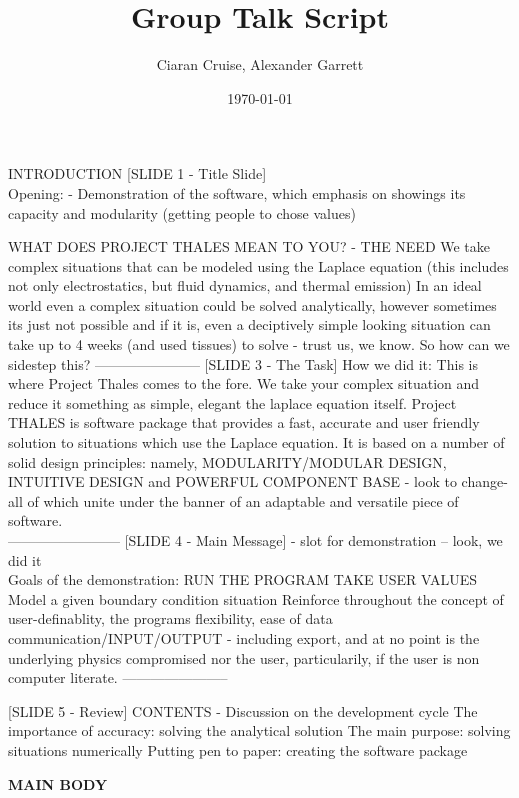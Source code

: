 \documentclass{article}
\title{Group Talk Script}
\author{Ciaran Cruise, Alexander Garrett}
\date{\today}
\begin{document}
\maketitle



INTRODUCTION
[SLIDE 1 - Title Slide]\\
Opening: 
- Demonstration of the software, which emphasis on showings its capacity and modularity (getting people to chose values)

WHAT DOES PROJECT THALES MEAN TO YOU? - THE NEED
We take complex situations that can be modeled using the Laplace equation (this includes not only electrostatics, but fluid dynamics, and thermal emission)
In an ideal world even a complex situation could be solved analytically, however sometimes its just not possible and if it is, even a deciptively simple
looking situation can take up to 4 weeks (and used tissues) to solve - trust us, we know. So how can we sidestep this? 
-----------------------
[SLIDE 3 - The Task]
How we did it:
This is where Project Thales comes to the fore. We take your complex situation and reduce it something as simple, elegant the laplace equation itself.  
Project THALES is software package that provides a fast, accurate and user friendly solution to situations which use the Laplace equation. It is based
on a number of solid design principles: namely, MODULARITY/MODULAR DESIGN, INTUITIVE DESIGN and POWERFUL COMPONENT BASE - look to change- all of which 
unite under the banner of an adaptable and versatile piece of software. \\
------------------------
[SLIDE 4 - Main Message]
- slot for demonstration -- look, we did it\\
Goals of the demonstration:
RUN THE PROGRAM
TAKE USER VALUES
Model a given boundary condition situation
Reinforce throughout the concept of user-definablity, the programs flexibility, ease of data communication/INPUT/OUTPUT - including export,
and at no point is the underlying physics compromised nor the user, particularily, if the user is non computer literate. 
-----------------------

[SLIDE 5 - Review]
CONTENTS
- Discussion on the development cycle
The importance of accuracy: solving the analytical solution
The main purpose: solving situations numerically
Putting pen to paper: creating the software package\\
\begin{center}
\textbf{MAIN BODY}\\
\end{center}
\end{document}
